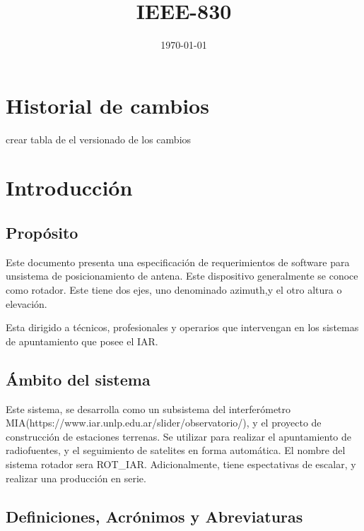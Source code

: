 \documentclass[12pt,a4paper, twosite]{article}
\date{\today}
\title{IEEE-830}
\begin{document}
	\begin{titlepage}
		\maketitle
		
	\end{titlepage}

\section*{Historial de cambios  }
crear tabla de el versionado de los cambios 

\newpage
	\tableofcontents	
\newpage
	\section{Introducción}
	\label{sec:org60390fa}



	
	\subsection{Propósito}
	\label{sec:org434c3ef}
	Este documento presenta una especificación de requerimientos de software para unsistema de  posicionamiento de antena. Este dispositivo generalmente se conoce como rotador. Este tiene dos ejes, uno denominado azimuth,y el otro altura o elevación. 
	 
	Esta dirigido a técnicos, profesionales y operarios que intervengan en los sistemas de apuntamiento que posee el IAR.   

	
	
	\subsection{Ámbito del sistema}
	\label{sec:org12e44a1}
	Este sistema, se desarrolla como un subsistema del interferómetro MIA(https://www.iar.unlp.edu.ar/slider/observatorio/), y el proyecto de construcción de estaciones terrenas. Se utilizar para realizar el apuntamiento de radiofuentes, y el seguimiento de satelites en forma automática.  El nombre del sistema rotador sera ROT\_IAR. Adicionalmente, tiene espectativas de escalar, y realizar una producción en serie. 
	
	
	\subsection{Definiciones, Acrónimos y Abreviaturas}
	\label{sec:orgb158e36}
	
\end{document}
